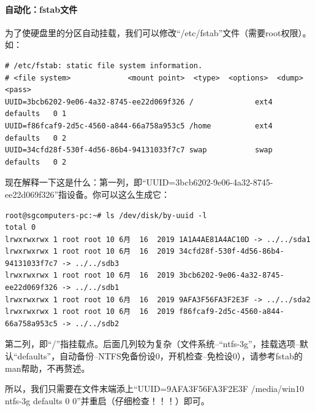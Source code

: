 \paragraph{自动化：fstab文件}
为了使硬盘里的分区自动挂载，我们可以修改“/etc/fstab”文件（需要root权限）。如：
\begin{verbatim}
# /etc/fstab: static file system information.
# <file system>             <mount point>  <type>  <options>  <dump>  <pass>
UUID=3bcb6202-9e06-4a32-8745-ee22d069f326 /              ext4    defaults   0 1
UUID=f86fcaf9-2d5c-4560-a844-66a758a953c5 /home          ext4    defaults   0 2
UUID=34cfd28f-530f-4d56-86b4-94131033f7c7 swap           swap    defaults   0 2
\end{verbatim} \par
现在解释一下这是什么：第一列，即“UUID=3bcb6202-9e06-4a32-8745-ee22d069f326”指设备。你可以这么生成它：
\begin{verbatim}
root@sgcomputers-pc:~# ls /dev/disk/by-uuid -l
total 0
lrwxrwxrwx 1 root root 10 6月  16  2019 1A1A4AE81A4AC10D -> ../../sda1
lrwxrwxrwx 1 root root 10 6月  16  2019 34cfd28f-530f-4d56-86b4-94131033f7c7 -> ../../sdb3
lrwxrwxrwx 1 root root 10 6月  16  2019 3bcb6202-9e06-4a32-8745-ee22d069f326 -> ../../sdb1
lrwxrwxrwx 1 root root 10 6月  16  2019 9AFA3F56FA3F2E3F -> ../../sda2
lrwxrwxrwx 1 root root 10 6月  16  2019 f86fcaf9-2d5c-4560-a844-66a758a953c5 -> ../../sdb2
\end{verbatim} \par
第二列，即“/”指挂载点。后面几列较为复杂（文件系统--“ntfs-3g”，挂载选项--默认“defaults”，自动备份--NTFS免备份设0，开机检查--免检设0），请参考fstab的man帮助，不再赘述。\par
所以，我们只需要在文件末端添上“UUID=9AFA3F56FA3F2E3F  /media/win10 ntfs-3g defaults   0 0”并重启（仔细检查！！！）即可。
